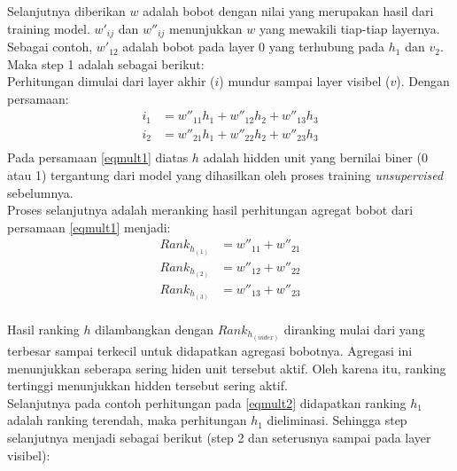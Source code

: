 Selanjutnya diberikan $w$ adalah bobot dengan nilai yang merupakan hasil dari training model. $w'_{ij}$ dan $w''_{ij}$ menunjukkan $w$ yang mewakili tiap-tiap layernya. Sebagai contoh, $w'_{12}$ adalah bobot pada layer 0 yang terhubung pada $h_1$ dan $v_2$.\\
Maka step 1 adalah sebagai berikut:\\
Perhitungan dimulai dari layer akhir ($i$) mundur sampai layer visibel ($v$). Dengan persamaan:
\begin{equation}
\begin{aligned}
i_1 &= w''_{11}h_1+w''_{12}h_2+w''_{13}h_3 \\
i_2 &= w''_{21}h_1+w''_{22}h_2+w''_{23}h_3 \\
\end{aligned}
\label{eqmult1}
\end{equation}
Pada persamaan \ref{eqmult1} diatas $h$ adalah hidden unit yang bernilai biner (0 atau 1) tergantung dari model yang dihasilkan oleh proses training \textit{unsupervised} sebelumnya.\\
Proses selanjutnya adalah meranking hasil perhitungan agregat bobot dari persamaan \ref{eqmult1} menjadi:
\begin{equation}
\begin{aligned}
Rank_{h_{(1)}} &= w''_{11}+w''_{21} \\
Rank_{h_{(2)}} &= w''_{12}+w''_{22} \\
Rank_{h_{(3)}} &= w''_{13}+w''_{23} \\
\end{aligned}
\label{eqmult2}
\end{equation}

Hasil ranking $h$ dilambangkan dengan $Rank_{h_{(index)}}$ diranking mulai dari yang terbesar sampai terkecil untuk didapatkan agregasi bobotnya. Agregasi ini menunjukkan seberapa sering hiden unit tersebut aktif. Oleh karena itu, ranking tertinggi menunjukkan hidden tersebut sering aktif. \\ 
Selanjutnya pada contoh perhitungan pada \ref{eqmult2} didapatkan ranking $h_1$ adalah ranking terendah, maka perhitungan $h_1$ dieliminasi. Sehingga step selanjutnya menjadi sebagai berikut (step 2 dan seterusnya sampai pada layer visibel):

